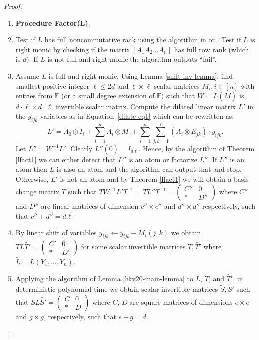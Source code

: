 \documentclass[10pt,a4paper]{article}
\newcommand{\F}{\mathbb{F}}
\begin{document}
\begin{proof}
\begin{enumerate}
\item[]   {\bf Procedure Factor(L)}.
\item Test if $L$ has full noncommutative rank using the algorithm in
  \cite{IQS17} or \cite{GGOW20}. Test if $L$ is right monic by checking if
  the matrix $[A_1 A_2 \ldots A_n]$ has full row rank (which is $d$).
  If $L$ is not full and right monic the algorithm outputs ``fail''.
\item Assume $L$ is full and right monic. Using Lemma
  \ref{shift-inv-lemma}, find smallest positive integer $\ell \leq 2d$
  and $\ell\times \ell$ scalar matrices $M_i, i\in [n]$ with entries
  from $\F$ (or a small degree extension of $\F$) such that
  $W=L(\bar{M})$ is $d \cdot \ell \times d \cdot \ell$ invertible
  scalar matrix. Compute the dilated linear matrix $L'$ in the
  $y_{ijk}$ variables as in Equation~\ref{dilate-eq1} which can be
  rewritten as:
\[
L' = A_0\otimes I_\ell + \sum_{i=1}^n A_i\otimes M_i +
\sum_{i=1}^n\sum_{j,k=1}^\ell (A_i\otimes E_{jk})\cdot y_{ijk}.
\]
Let $L''= W^{-1} L'$. Clearly $L''(\overline{0})= I_{d\ell}$. Hence,
by the algorithm of Theorem \ref{lfact1} we can either detect that
$L''$ is an atom or factorize $L''$. If $L''$ is an atom then $L$ is
also an atom and the algorithm can output that and stop.  Otherwise,
$L'$ is not an atom and by Theorem \ref{lfact1} we will obtain a basis  
change matrix $T$ such that $T W^{-1} L' T^{-1}= T L'' T^{-1} = \left(
\begin{array}{cc}
C'' & 0 \\
* & D''
\end{array}
\right)$ where $C''$ and $D''$ are linear matrices of dimension $c''
\times c''$ and $d'' \times d''$ respectively, such that $c''+ d'' = d
\ell$.

%
%
%
%
%
%
  
\item By linear shift of variables $y_{ijk} \leftarrow y_{ijk} -
  M_i(j,k)$ we obtain $\tilde{T} \tilde{L} \tilde{T'} = \left(
\begin{array}{cc}
C' & 0 \\
* & D'
\end{array}
\right)$    
for some scalar invertible matrices $\tilde{T}, \tilde{T'}$ where
$\tilde{L} = L( Y_1, \ldots, Y_n)$.

\item Applying the algorithm of Lemma \ref{hkv20-main-lemma} to
  $\tilde{L}$, $\tilde{T}$, and $\tilde{T'}$, in deterministic
  polynomial time we obtain scalar invertible matrices $\tilde{S}, \tilde{S'}$ such
  that $\tilde{S}L\tilde{S'} = \left(
\begin{array}{cc}
C & 0 \\
* & D
\end{array}
\right) $
where $C$, $D$ are square matrices of dimensions $e \times e$ and $g
\times g$, respectively, such that $e+g = d$.


\end{enumerate}
\end{proof}
\end{document}
